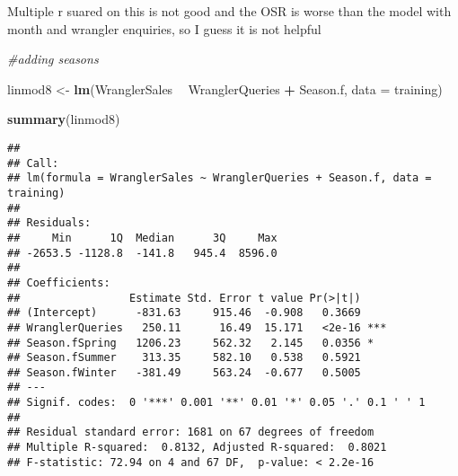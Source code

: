 \documentclass[]{article}
\newenvironment{Shaded}{\begin{snugshade}}{\end{snugshade}}
\newcommand{\KeywordTok}[1]{\textcolor[rgb]{0.13,0.29,0.53}{\textbf{#1}}}
\newcommand{\DataTypeTok}[1]{\textcolor[rgb]{0.13,0.29,0.53}{#1}}
\newcommand{\DecValTok}[1]{\textcolor[rgb]{0.00,0.00,0.81}{#1}}
\newcommand{\StringTok}[1]{\textcolor[rgb]{0.31,0.60,0.02}{#1}}
\newcommand{\CommentTok}[1]{\textcolor[rgb]{0.56,0.35,0.01}{\textit{#1}}}
\newcommand{\OperatorTok}[1]{\textcolor[rgb]{0.81,0.36,0.00}{\textbf{#1}}}
\newcommand{\NormalTok}[1]{#1}
\begin{document}
Multiple r suared on this is not good and the OSR is worse than the
model with month and wrangler enquiries, so I guess it is not helpful

\begin{Shaded}
\begin{Highlighting}[]
\CommentTok{#adding seasons}


\NormalTok{linmod8 <-}\StringTok{ }\KeywordTok{lm}\NormalTok{(WranglerSales }\OperatorTok{~}\StringTok{ }\NormalTok{WranglerQueries }\OperatorTok{+}\StringTok{ }\NormalTok{Season.f, }\DataTypeTok{data =}\NormalTok{ training)}

\KeywordTok{summary}\NormalTok{(linmod8)}
\end{Highlighting}
\end{Shaded}

\begin{verbatim}
## 
## Call:
## lm(formula = WranglerSales ~ WranglerQueries + Season.f, data = training)
## 
## Residuals:
##     Min      1Q  Median      3Q     Max 
## -2653.5 -1128.8  -141.8   945.4  8596.0 
## 
## Coefficients:
##                 Estimate Std. Error t value Pr(>|t|)    
## (Intercept)      -831.63     915.46  -0.908   0.3669    
## WranglerQueries   250.11      16.49  15.171   <2e-16 ***
## Season.fSpring   1206.23     562.32   2.145   0.0356 *  
## Season.fSummer    313.35     582.10   0.538   0.5921    
## Season.fWinter   -381.49     563.24  -0.677   0.5005    
## ---
## Signif. codes:  0 '***' 0.001 '**' 0.01 '*' 0.05 '.' 0.1 ' ' 1
## 
## Residual standard error: 1681 on 67 degrees of freedom
## Multiple R-squared:  0.8132, Adjusted R-squared:  0.8021 
## F-statistic: 72.94 on 4 and 67 DF,  p-value: < 2.2e-16
\end{verbatim}

\begin{Shaded}
\end{Shaded}
\end{document}
